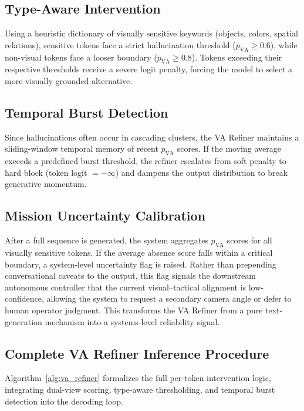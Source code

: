 \subsection{Type-Aware Intervention}
Using a heuristic dictionary of visually sensitive keywords (objects, colors, spatial relations), sensitive tokens face a strict hallucination threshold ($p_{\text{VA}} \geq 0.6$), while non-visual tokens face a looser boundary ($p_{\text{VA}} \geq 0.8$). Tokens exceeding their respective thresholds receive a severe logit penalty, forcing the model to select a more visually grounded alternative.

\subsection{Temporal Burst Detection}
Since hallucinations often occur in cascading clusters, the VA Refiner maintains a sliding-window temporal memory of recent $p_{\text{VA}}$ scores. If the moving average exceeds a predefined burst threshold, the refiner escalates from soft penalty to hard block (token logit $= -\infty$) and dampens the output distribution to break generative momentum.

\subsection{Mission Uncertainty Calibration}
After a full sequence is generated, the system aggregates $p_{\text{VA}}$ scores for all visually sensitive tokens. If the average absence score falls within a critical boundary, a system-level uncertainty flag is raised. Rather than prepending conversational caveats to the output, this flag signals the downstream autonomous controller that the current visual--tactical alignment is low-confidence, allowing the system to request a secondary camera angle or defer to human operator judgment. This transforms the VA Refiner from a pure text-generation mechanism into a systems-level reliability signal.

\subsection{Complete VA Refiner Inference Procedure}

Algorithm~\ref{alg:va_refiner} formalizes the full per-token intervention logic, integrating dual-view scoring, type-aware thresholding, and temporal burst detection into the decoding loop.

